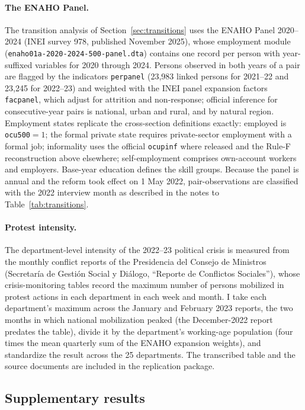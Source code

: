 \paragraph{The ENAHO Panel.} The transition analysis of Section~\ref{sec:transitions} uses the ENAHO Panel 2020--2024 (INEI survey 978, published November 2025), whose employment module (\texttt{enaho01a-2020-2024-500-panel.dta}) contains one record per person with year-suffixed variables for 2020 through 2024. Persons observed in both years of a pair are flagged by the indicators \texttt{perpanel} (23,983 linked persons for 2021--22 and 23,245 for 2022--23) and weighted with the INEI panel expansion factors \texttt{facpanel}, which adjust for attrition and non-response; official inference for consecutive-year pairs is national, urban and rural, and by natural region. Employment states replicate the cross-section definitions exactly: employed is \texttt{ocu500}${}=1$; the formal private state requires private-sector employment with a formal job; informality uses the official \texttt{ocupinf} where released and the Rule-F reconstruction above elsewhere; self-employment comprises own-account workers and employers. Base-year education defines the skill groups. Because the panel is annual and the reform took effect on 1 May 2022, pair-observations are classified with the 2022 interview month as described in the notes to Table~\ref{tab:transitions}.

\paragraph{Protest intensity.} The department-level intensity of the 2022--23 political crisis is measured from the monthly conflict reports of the Presidencia del Consejo de Ministros (Secretar\'ia de Gesti\'on Social y Di\'alogo, ``Reporte de Conflictos Sociales''), whose crisis-monitoring tables record the maximum number of persons mobilized in protest actions in each department in each week and month. I take each department's maximum across the January and February 2023 reports, the two months in which national mobilization peaked (the December-2022 report predates the table), divide it by the department's working-age population (four times the mean quarterly sum of the ENAHO expansion weights), and standardize the result across the 25 departments. The transcribed table and the source documents are included in the replication package.

\subsection{Supplementary results}


